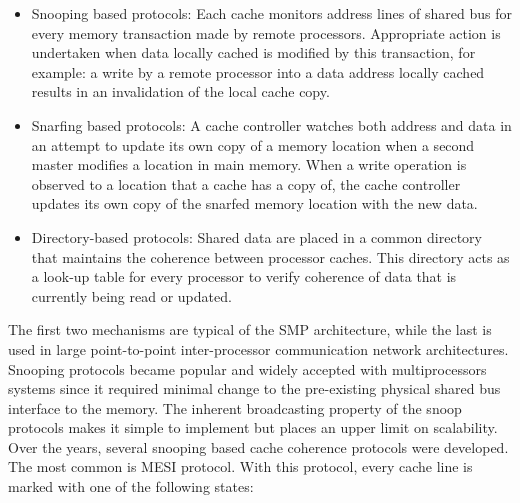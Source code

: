 \begin{itemize}

\item Snooping based protocols: Each cache monitors address lines of shared bus for every memory transaction made by remote processors. Appropriate action
is undertaken when data locally cached is modified by this transaction, for example: a write by a remote processor into a data address locally cached 
results in an invalidation of the local cache copy.

\item Snarfing based protocols: A cache controller watches both address and data in an attempt to update its own copy of a memory location when a second 
master modifies a location in main memory. When a write operation is observed to a location that a cache has a copy of, the cache controller updates its 
own copy of the snarfed memory location with the new data.

\item Directory-based protocols: Shared data are placed in a common directory that maintains the coherence between processor caches. 
This directory acts as a look-up table for every processor to verify coherence of data that is currently being read or updated.

\end{itemize}


The first two mechanisms are typical of the SMP architecture, while the last is used in large point-to-point inter-processor communication network 
architectures. Snooping protocols became popular and widely accepted with multiprocessors systems since it required minimal change to the pre-existing 
physical shared bus interface to the memory. The inherent broadcasting property of the snoop protocols makes it simple to implement but places an upper 
limit on scalability.
Over the years, several snooping based cache coherence protocols were developed. The most common is MESI protocol.
With this protocol, every cache line is marked with one of the following states:

